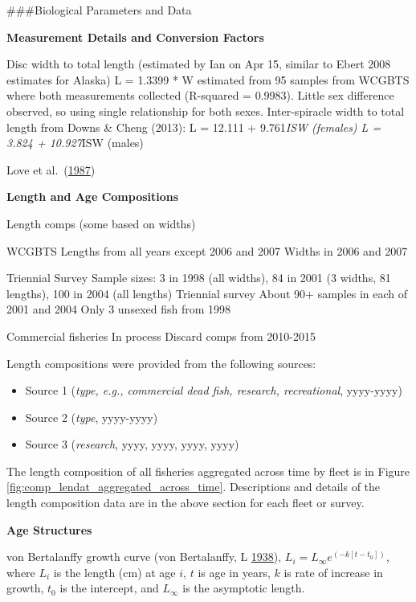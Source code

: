 \documentclass[12pt,]{article}
\begin{document}
\#\#\#Biological Parameters and Data

\textbf{Measurement Details and Conversion Factors}

Disc width to total length (estimated by Ian on Apr 15, similar to Ebert
2008 estimates for Alaska) L = 1.3399 * W estimated from 95 samples from
WCGBTS where both measurements collected (R-squared = 0.9983). Little
sex difference observed, so using single relationship for both sexes.
Inter-spiracle width to total length from Downs \& Cheng (2013): L =
12.111 + 9.761\emph{ISW (females) L = 3.824 + 10.927}ISW (males)

Love et al.~(\protect\hyperlink{ref-Love1987}{1987})

\textbf{Length and Age Compositions}

Length comps (some based on widths)

WCGBTS Lengths from all years except 2006 and 2007 Widths in 2006 and
2007

Triennial Survey Sample sizes: 3 in 1998 (all widths), 84 in 2001 (3
widths, 81 lengths), 100 in 2004 (all lengths) Triennial survey About
90+ samples in each of 2001 and 2004 Only 3 unsexed fish from 1998

Commercial fisheries In process Discard comps from 2010-2015

Length compositions were provided from the following sources:

\begin{itemize}[noitemsep,nolistsep,topsep=0pt]
  \item Source 1 (\emph{type, e.g., commercial dead fish, research, recreational}, yyyy-yyyy)    
  \item Source 2 (\emph{type}, yyyy-yyyy)    
  \item Source 3 (\emph{research}, yyyy, yyyy, yyyy, yyyy) 
\end{itemize}

The length composition of all fisheries aggregated across time by fleet
is in Figure \ref{fig:comp_lendat_aggregated_across_time}. Descriptions
and details of the length composition data are in the above section for
each fleet or survey.

\vspace{.5cm}

\textbf{Age Structures}

von Bertalanffy growth curve (von Bertalanffy, L
\protect\hyperlink{ref-vonBertalanffy1938}{1938}),
\(L_i = L_{\infty}e^{(-k[t-t_0])}\), where \(L_i\) is the length (cm) at
age \(i\), \(t\) is age in years, \(k\) is rate of increase in growth,
\(t_0\) is the intercept, and \(L_{\infty}\) is the asymptotic length.
\end{document}
